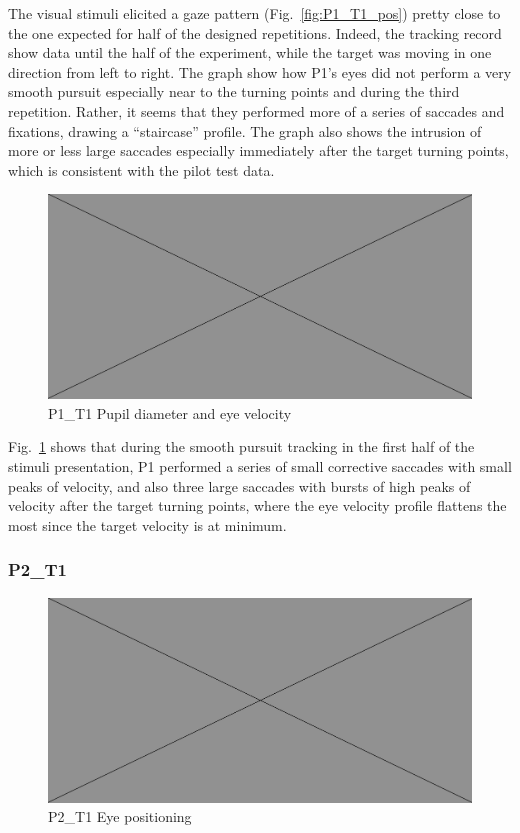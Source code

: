The visual stimuli elicited a gaze pattern (Fig.~\ref{fig:P1_T1_pos}) pretty close to the one expected for half of the designed repetitions. Indeed, the tracking record show data until the half of the experiment, while the target was moving in one direction from left to right. The graph show how P1’s eyes did not perform a very smooth pursuit especially near to the turning points and during the third repetition. Rather, it seems that they performed more of a series of saccades and fixations, drawing a “staircase” profile.
The graph also shows the intrusion of more or less large saccades especially immediately after the target turning points, which is consistent with the pilot test data.

\begin{figure}[h]
  \centering
  \includegraphics[width=.5\textwidth]{figures/placeholderImg.jpg}
  \caption[P1\_T1 pupil velocity]{P1\_T1 Pupil diameter and eye velocity}
  \label{fig:P1_T1_vel}
\end{figure}

Fig.~\ref{fig:P1_T1_vel} shows that during the smooth pursuit tracking in the first half of the stimuli presentation, P1 performed a series of small corrective saccades with small peaks of velocity, and also three large saccades with bursts of high peaks of velocity after the target turning points, where the eye velocity profile flattens the most since the target velocity is at minimum.


\subsubsection{P2\_T1}
\label{sec:P2_T1}

\begin{figure}[h]
  \centering
  \includegraphics[width=.5\textwidth]{figures/placeholderImg.jpg}
  \caption[P2\_T1 Eye positioning]{P2\_T1 Eye positioning}
  \label{fig:P2_T1_pos}
\end{figure}

